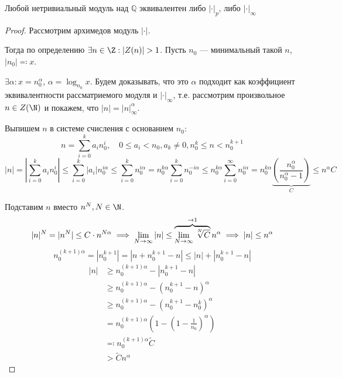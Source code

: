\begin{theorem}[Островский]
	Любой нетривиальный модуль над \(\mathbb{Q}\) эквивалентен либо \(|\cdot|_p\), либо \(|\cdot|_{\infty}\)
\end{theorem}
\begin{proof}
	Рассмотрим архимедов модуль \(|\cdot|\).

	Тогда по определению \(\exists n \in \Z : |Z(n)| > 1\).
	Пусть \(n_0\) --- минимальный такой \(n\), \(|n_0| \eqqcolon x\).

	\(\exists \alpha : x = n_0^\alpha\), \(\alpha = \log_{n_0} x\).
	Будем доказывать, что это \(\alpha\) подходит как коэффициент эквивалентности рассматриемого модуля и  \( |\cdot|_{\infty}\), т.е.
	рассмотрим произвольное \(n \in Z(\N)\) и покажем, что \(|n| = |n|_{\infty}^\alpha\).

	Выпишем \(n\) в системе счисления с основанием  \(n_0\):
	\[n = \sum_{i=0}^k a_i n_0^i, \quad 0 \le a_i < n_0, a_k \neq 0, n_0^k \le n < n_0^{k+1}\]
	\[|n| = \left|\sum_{i=0}^k a_i n_0^i\right| \le \sum_{i=0}^k |a_i| n_0^{i\alpha}
		\le \sum_{i=0}^k n_0^{i\alpha} = n_0^{k\alpha} \sum_{i=0}^k n_0^{-i\alpha}
		\le n_0^{k\alpha} \sum_{i=0}^{\infty} n_0^{i\alpha}
		= n_0^{k\alpha} \underbrace{\left(\frac{n_0^\alpha}{n_0^\alpha - 1}\right)}_{C}
		\le n^\alpha C\]

	Подставим \(n\) вместо \(n^N, N \in \N\).
	\begin{equation}
		\label{eq:nle}
		|n|^N = |n^N| \le C \cdot n^{N\alpha} \implies \lim_{N \to \infty} |n|
		\le \overbrace{\lim_{N \to \infty} \sqrt[\leftroot{-1}\uproot{2}N]{C}}^{\to 1} n^\alpha
		\implies |n| \le n^\alpha
	\end{equation}
	\[n_0^{(k+1)\alpha} = |n_0^{k+1}| = |n + n_0^{k+1} - n| \le |n| + |n_0^{k+1}-n|\]
	\begin{align}
		|n| & \ge n_0^{(k+1)\alpha} - |n_0^{k+1} - n|                                   \\
		    & \ge n_0^{(k+1)\alpha} - (n_0^{k+1} - n)^\alpha                            \\
		    & \ge n_0^{(k+1)\alpha} - (n_0^{k+1} - n_0^k)^\alpha                        \\
		    & = n_0^{(k+1)\alpha}\left(1 - \left(1 - \frac{1}{n_0}\right)^\alpha\right) \\
		    & \eqqcolon n_0^{(k+1)\alpha} \tilde{C}                                     \\
		    & > \tilde{C} n^\alpha
	\end{align}


\end{proof}
